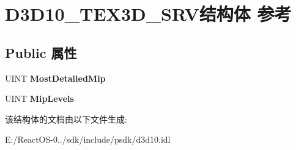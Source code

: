 \hypertarget{struct_d3_d10___t_e_x3_d___s_r_v}{}\section{D3\+D10\+\_\+\+T\+E\+X3\+D\+\_\+\+S\+R\+V结构体 参考}
\label{struct_d3_d10___t_e_x3_d___s_r_v}
\subsection*{Public 属性}
\begin{DoxyCompactItemize}
\item 
\mbox{\label{struct_d3_d10___t_e_x3_d___s_r_v_ada2f212276bbf720ed9c94923a92c3cb}} 
U\+I\+NT {\bfseries Most\+Detailed\+Mip}
\item 
\mbox{\label{struct_d3_d10___t_e_x3_d___s_r_v_aec88538d6e5d97001d9c3d9602ef6b75}} 
U\+I\+NT {\bfseries Mip\+Levels}
\end{DoxyCompactItemize}


该结构体的文档由以下文件生成\+:\begin{DoxyCompactItemize}
\item 
E\+:/\+React\+O\+S-\/0../sdk/include/psdk/d3d10.\+idl\end{DoxyCompactItemize}
